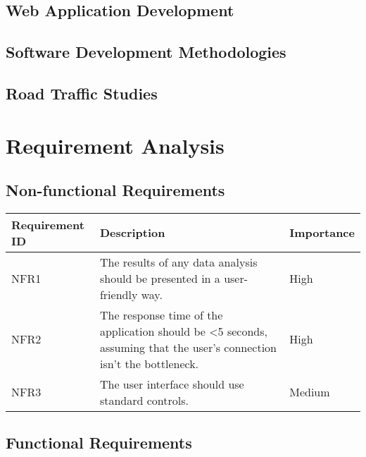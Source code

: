 \documentclass[authoryearcitations]{UoYCSproject}
\begin{document}
\section{Web Application Development}

\section{Software Development Methodologies}

\section{Road Traffic Studies}

\chapter{Requirement Analysis}

\section{Non-functional Requirements}

\begin{tabular}{| p{2.2cm} | p{7.5cm} | p{2cm} |}
	\hline
	\textbf{Requirement ID} & \textbf{Description} & \textbf{Importance} \\ \hline
	NFR1 & The results of any data analysis should be presented in a user-friendly way. & High \\ \hline
	NFR2 & The response time of the application should be <5 seconds, assuming that the user's connection isn't the bottleneck. & High \\ \hline
	NFR3 & The user interface should use standard controls. & Medium \\
	\hline
\end{tabular}

\section{Functional Requirements}
\end{document}
